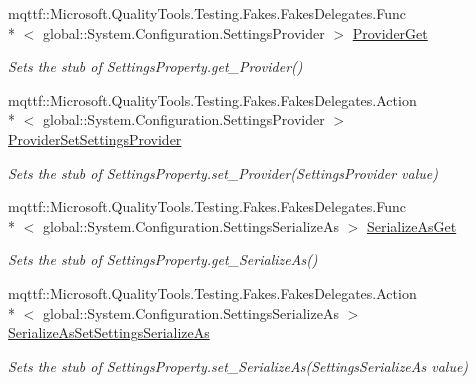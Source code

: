 \begin{DoxyCompactItemize}
mqttf\-::\-Microsoft.\-Quality\-Tools.\-Testing.\-Fakes.\-Fakes\-Delegates.\-Func\\*
$<$ global\-::\-System.\-Configuration.\-Settings\-Provider $>$ \hyperlink{class_system_1_1_configuration_1_1_fakes_1_1_stub_settings_property_a7e2001ac68cd27b3615f9cf698f6b425}{Provider\-Get}
\begin{DoxyCompactList}\small\item\em Sets the stub of Settings\-Property.\-get\-\_\-\-Provider()\end{DoxyCompactList}\item 
mqttf\-::\-Microsoft.\-Quality\-Tools.\-Testing.\-Fakes.\-Fakes\-Delegates.\-Action\\*
$<$ global\-::\-System.\-Configuration.\-Settings\-Provider $>$ \hyperlink{class_system_1_1_configuration_1_1_fakes_1_1_stub_settings_property_ac8315cf10c996663a2fd7860bb36f6dc}{Provider\-Set\-Settings\-Provider}
\begin{DoxyCompactList}\small\item\em Sets the stub of Settings\-Property.\-set\-\_\-\-Provider(\-Settings\-Provider value)\end{DoxyCompactList}\item 
mqttf\-::\-Microsoft.\-Quality\-Tools.\-Testing.\-Fakes.\-Fakes\-Delegates.\-Func\\*
$<$ global\-::\-System.\-Configuration.\-Settings\-Serialize\-As $>$ \hyperlink{class_system_1_1_configuration_1_1_fakes_1_1_stub_settings_property_aeaa760d97f366560ef2a62054c13bf2c}{Serialize\-As\-Get}
\begin{DoxyCompactList}\small\item\em Sets the stub of Settings\-Property.\-get\-\_\-\-Serialize\-As()\end{DoxyCompactList}\item 
mqttf\-::\-Microsoft.\-Quality\-Tools.\-Testing.\-Fakes.\-Fakes\-Delegates.\-Action\\*
$<$ global\-::\-System.\-Configuration.\-Settings\-Serialize\-As $>$ \hyperlink{class_system_1_1_configuration_1_1_fakes_1_1_stub_settings_property_a244685ebe2df32776dc6578f48d97156}{Serialize\-As\-Set\-Settings\-Serialize\-As}
\begin{DoxyCompactList}\small\item\em Sets the stub of Settings\-Property.\-set\-\_\-\-Serialize\-As(\-Settings\-Serialize\-As value)\end{DoxyCompactList}\end{DoxyCompactItemize}

